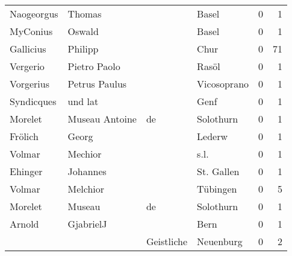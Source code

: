 \begin{tabular}{llllrr}
               Naogeorgus &                             Thomas &             &                                       Basel &          0 &         1 \\
                 MyConius &                             Oswald &             &                                       Basel &          0 &         1 \\
                Gallicius &                            Philipp &             &                                        Chur &          0 &        71 \\
                 Vergerio &                       Pietro Paolo &             &                                       Rasöl &          0 &         1 \\
                Vorgerius &                      Petrus Paulus &             &                                 Vicosoprano &          0 &         1 \\
               Syndicques &                            und lat &             &                                        Genf &          0 &         1 \\
                  Morelet &                     Museau Antoine &          de &                                   Solothurn &          0 &         1 \\
                  Frölich &                              Georg &             &                                      Lederw &          0 &         1 \\
                   Volmar &                            Mechior &             &                                        s.l. &          0 &         1 \\
                  Ehinger &                           Johannes &             &                                  St. Gallen &          0 &         1 \\
                   Volmar &                           Melchior &             &                                    Tübingen &          0 &         5 \\
                  Morelet &                             Museau &          de &                                   Solothurn &          0 &         1 \\
                   Arnold &                          GjabrielJ &             &                                        Bern &          0 &         1 \\
                          &                                    &  Geistliche &                                   Neuenburg &          0 &         2 \\

\end{tabular}
